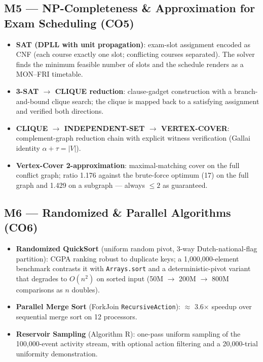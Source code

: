\documentclass[11pt,a4paper]{article}
\begin{document}
\subsection{M5 --- NP-Completeness \& Approximation for Exam Scheduling (CO5)}
\begin{itemize}
    \item \textbf{SAT (DPLL with unit propagation)}: exam-slot assignment encoded as CNF
    (each course exactly one slot; conflicting courses separated). The solver finds the
    minimum feasible number of slots and the schedule renders as a MON--FRI timetable.
    \item \textbf{3-SAT $\to$ CLIQUE reduction}: clause-gadget construction with a
    branch-and-bound clique search; the clique is mapped back to a satisfying assignment
    and verified both directions.
    \item \textbf{CLIQUE $\to$ INDEPENDENT-SET $\to$ VERTEX-COVER}: complement-graph
    reduction chain with explicit witness verification (Gallai identity $\alpha + \tau = |V|$).
    \item \textbf{Vertex-Cover 2-approximation}: maximal-matching cover on the full
    conflict graph; ratio 1.176 against the brute-force optimum (17) on the full graph
    and 1.429 on a subgraph --- always $\le 2$ as guaranteed.
\end{itemize}

\subsection{M6 --- Randomized \& Parallel Algorithms (CO6)}
\begin{itemize}
    \item \textbf{Randomized QuickSort} (uniform random pivot, 3-way
    Dutch-national-flag partition): CGPA ranking robust to duplicate keys; a
    1{,}000{,}000-element benchmark contrasts it with \texttt{Arrays.sort} and a
    deterministic-pivot variant that degrades to $O(n^2)$ on sorted input
    (50M $\to$ 200M $\to$ 800M comparisons as $n$ doubles).
    \item \textbf{Parallel Merge Sort} (ForkJoin \texttt{RecursiveAction}):
    $\approx$ 3.6$\times$ speedup over sequential merge sort on 12 processors.
    \item \textbf{Reservoir Sampling} (Algorithm R): one-pass uniform sampling of the
    100{,}000-event activity stream, with optional action filtering and a 20{,}000-trial
    uniformity demonstration.
\end{itemize}
\end{document}
